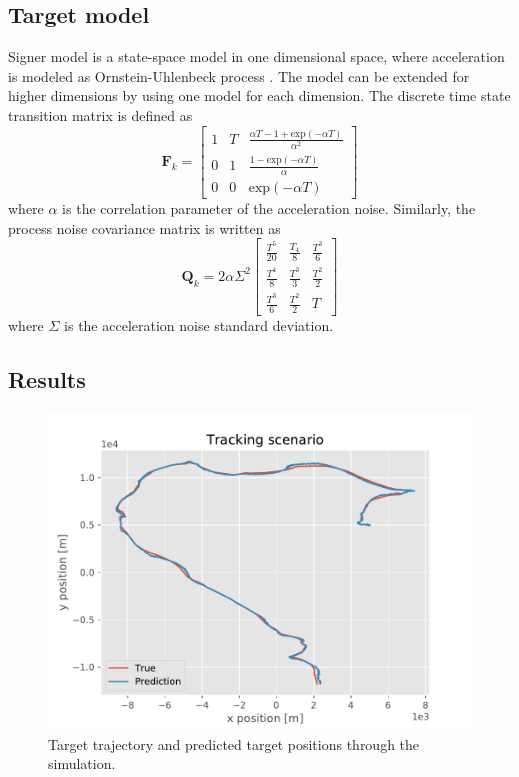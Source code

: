 \documentclass[english, 12pt, a4paper, elec, utf8, a-1b, online]{aaltothesis}
\renewcommand{\vec}[1]{\mathbf{#1}}
\newcommand{\stmodel}{\vec{F}_k}
\newcommand{\pcov}{\vec{Q}_k}
\renewcommand{\exp}[1]{\text{exp}\left( #1 \right)}
\begin{document}
\subsection{Target model}

Signer model is a state-space model in one dimensional space, where acceleration is modeled as Ornstein-Uhlenbeck process \cite{Pilte2018}.
The model can be extended for higher dimensions by using one model for each dimension.
The discrete time state transition matrix is defined as
\begin{equation}
\stmodel = 
    \left[
        \begin{array}{ccc}
            1 & T & \frac{\alpha T - 1 + \exp{-\alpha T}}{\alpha^2} \\
            0 & 1 & \frac{1 - \exp{- \alpha T}}{\alpha} \\
            0 & 0 & \exp{- \alpha T}
        \end{array}
    \right]
\end{equation}
where $\alpha$ is the correlation parameter of the acceleration noise.
Similarly, the process noise covariance matrix is written as
\begin{equation}
    \pcov = 2 \alpha \Sigma^2 
    \left[
    \begin{array}{ccc}
        \frac{T^5}{20} & \frac{T_4}{8}  & \frac{T^3}{6} \\
        \frac{T^4}{8}  & \frac{T^3}{3} & \frac{T^2}{2} \\
        \frac{T^3}{6}  & \frac{T^2}{2} & T
    \end{array}
    \right]
\end{equation}
where $\Sigma$ is the acceleration noise standard deviation.






\subsection{Results}

\begin{figure}
    \centering
    \includegraphics[width=\textwidth]{figures/simulations/scenario.pdf}
    \caption{Target trajectory and predicted target positions through the simulation.}
    \label{fig:sim_scenario}
\end{figure}
\end{document}
